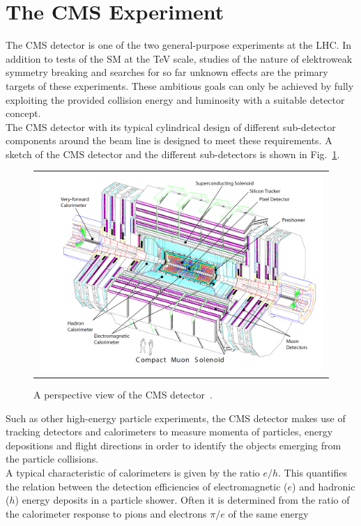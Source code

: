 \section{The CMS Experiment}
\label{sec:cms}
The CMS detector is one of the two general-purpose experiments at the LHC. In addition to tests of the SM at the TeV scale, studies of the nature of elektroweak symmetry breaking and searches for so far unknown effects are the primary targets of these experiments. These ambitious goals can only be achieved by fully exploiting the provided collision energy and luminosity with a suitable detector concept.\\
The CMS detector with its typical cylindrical design of different sub-detector components around the beam line is designed to meet these requirements. A sketch of the CMS detector and the different sub-detectors is shown in Fig.~\ref{fig:CMS}.
\begin{figure}[!tp]
  \centering
  \begin{tabular}{c}
    \includegraphics[width=0.99\textwidth]{figures/Figures_Experimental_Apparatus_CMS_perspective.png}
  \end{tabular}
  \caption{A perspective view of the CMS detector~\cite{Chatrchyan:2008zzk}.}
  \label{fig:CMS}
\end{figure}
Such as other high-energy particle experiments, the CMS detector makes use of tracking detectors and calorimeters to measure momenta of particles, energy depositions and flight directions in order to identify the objects emerging from the particle collisions. \\
A typical characteristic of calorimeters is given by the ratio $e/h$. This quantifies the relation between the detection efficiencies of electromagnetic ($e$) and hadronic ($h$) energy deposits in a particle shower. Often it is determined from the ratio of the calorimeter response to pions and electrons $\pi/e$ of the same energy
